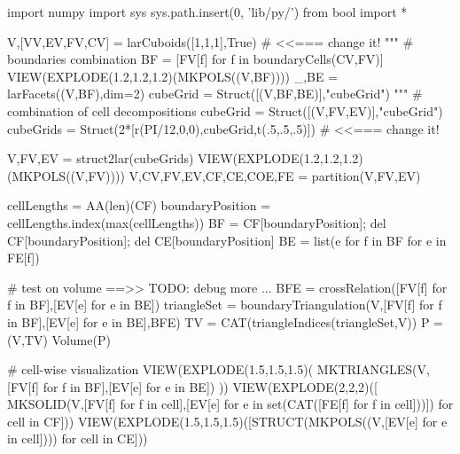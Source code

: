 import numpy
import sys
sys.path.insert(0, 'lib/py/')
from bool import *

V,[VV,EV,FV,CV] = larCuboids([1,1,1],True) # <<=== change it!
"""
# boundaries combination
BF = [FV[f] for f in boundaryCells(CV,FV)]
VIEW(EXPLODE(1.2,1.2,1.2)(MKPOLS((V,BF))))
_,BE = larFacets((V,BF),dim=2)
cubeGrid = Struct([(V,BF,BE)],"cubeGrid")
"""
# combination of cell decompositions
cubeGrid = Struct([(V,FV,EV)],"cubeGrid")
cubeGrids = Struct(2*[r(PI/12,0,0),cubeGrid,t(.5,.5,.5)]) # <<=== change it!

V,FV,EV = struct2lar(cubeGrids)
VIEW(EXPLODE(1.2,1.2,1.2)(MKPOLS((V,FV))))
V,CV,FV,EV,CF,CE,COE,FE = partition(V,FV,EV)

cellLengths = AA(len)(CF)
boundaryPosition = cellLengths.index(max(cellLengths))
BF = CF[boundaryPosition]; del CF[boundaryPosition]; del CE[boundaryPosition]
BE = list({e for f in BF for e in FE[f]})

# test on volume ==>> TODO: debug more ...
BFE = crossRelation([FV[f] for f in BF],[EV[e] for e in BE])
triangleSet = boundaryTriangulation(V,[FV[f] for f in BF],[EV[e] for e in BE],BFE)
TV = CAT(triangleIndices(triangleSet,V))
P = (V,TV)
Volume(P)

# cell-wise visualization
VIEW(EXPLODE(1.5,1.5,1.5)( MKTRIANGLES(V,[FV[f] for f in BF],[EV[e] for e in BE]) ))
VIEW(EXPLODE(2,2,2)([ MKSOLID(V,[FV[f] for f in cell],[EV[e] for e in set(CAT([FE[f] for f in cell]))]) for cell in CF]))
VIEW(EXPLODE(1.5,1.5,1.5)([STRUCT(MKPOLS((V,[EV[e] for e in cell]))) for cell in CE]))



